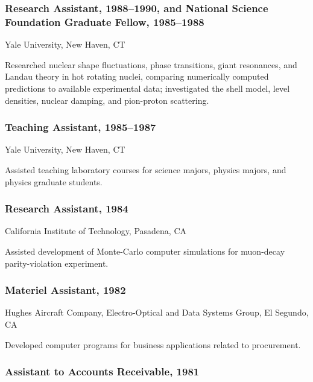 \documentclass[]{article}
\begin{document}
\subsubsection{Research Assistant, 1988--1990, and National Science
Foundation Graduate Fellow,
1985--1988}\label{research-assistant-19881990-and-national-science-foundation-graduate-fellow-19851988}

Yale University, New Haven, CT

Researched nuclear shape fluctuations, phase transitions, giant
resonances, and Landau theory in hot rotating nuclei, comparing
numerically computed predictions to available experimental data;
investigated the shell model, level densities, nuclear damping, and
pion-proton scattering.

\subsubsection{Teaching Assistant,
1985--1987}\label{teaching-assistant-19851987}

Yale University, New Haven, CT

Assisted teaching laboratory courses for science majors, physics majors,
and physics graduate students.

\subsubsection{Research Assistant, 1984}\label{research-assistant-1984}

California Institute of Technology, Pasadena, CA

Assisted development of Monte-Carlo computer simulations for muon-decay
parity-violation experiment.

\subsubsection{Materiel Assistant, 1982}\label{materiel-assistant-1982}

Hughes Aircraft Company, Electro-Optical and Data Systems Group, El
Segundo, CA

Developed computer programs for business applications related to
procurement.

\subsubsection{Assistant to Accounts Receivable,
1981}\label{assistant-to-accounts-receivable-1981}
\end{document}
